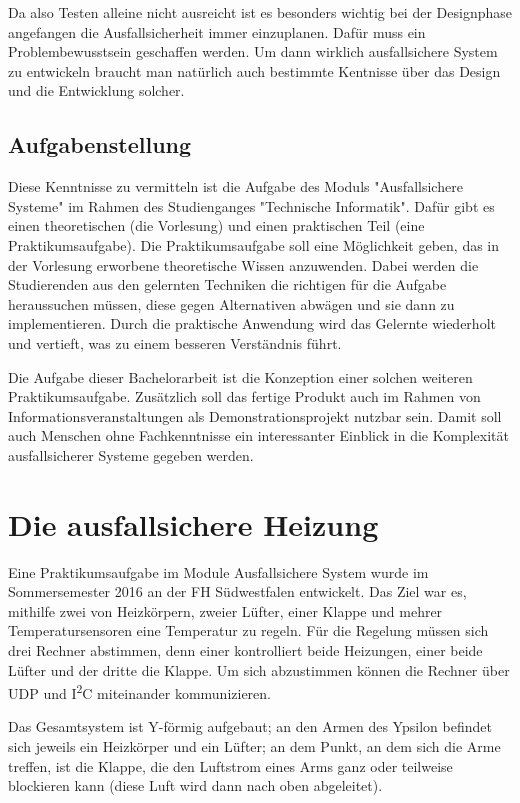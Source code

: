 Da also Testen alleine nicht ausreicht ist es besonders wichtig bei der Designphase angefangen die Ausfallsicherheit immer einzuplanen. Daf{\"{u}}r
muss ein Problembewusstsein geschaffen werden. Um dann wirklich ausfallsichere System zu entwickeln braucht man nat{\"{u}}rlich auch bestimmte Kentnisse 
{\"{u}}ber das Design und die Entwicklung solcher.

\subsection{Aufgabenstellung} 
Diese Kenntnisse zu vermitteln ist die Aufgabe des Moduls "Ausfallsichere Systeme" im Rahmen des Studienganges 
"Technische Informatik". Daf{\"{u}}r gibt es einen theoretischen (die Vorlesung) und einen praktischen Teil (eine 
Praktikumsaufgabe). Die Praktikumsaufgabe soll eine M{\"{o}}glichkeit geben, das in der Vorlesung erworbene 
theoretische Wissen anzuwenden. Dabei werden die Studierenden aus den gelernten Techniken die richtigen 
f{\"{u}}r die Aufgabe heraussuchen m{\"{u}}ssen, diese gegen Alternativen abw{\"{a}}gen und sie dann zu 
implementieren. Durch die  praktische Anwendung wird das Gelernte wiederholt und vertieft, was zu einem besseren 
Verst{\"{a}}ndnis f{\"{u}}hrt. 

Die Aufgabe dieser Bachelorarbeit ist die Konzeption einer solchen weiteren Praktikumsaufgabe. 
Zus{\"{a}}tzlich soll das fertige Produkt auch im Rahmen von Informationsveranstaltungen als Demonstrationsprojekt 
nutzbar sein. Damit soll auch Menschen ohne Fachkenntnisse ein interessanter Einblick in die 
Komplexit{\"{a}}t ausfallsicherer Systeme gegeben werden.

\section{Die ausfallsichere Heizung}\label{heizung}
Eine Praktikumsaufgabe im Module Ausfallsichere System wurde im Sommersemester 2016 an der FH S{\"{u}}dwestfalen entwickelt. Das Ziel war es, mithilfe zwei von Heizk{\"{o}}rpern, zweier
L{\"{u}}fter, einer Klappe und mehrer Temperatursensoren eine Temperatur zu regeln. F{\"{u}}r die Regelung m{\"{u}}ssen sich drei Rechner abstimmen, denn einer kontrolliert
beide Heizungen, einer beide L{\"{u}}fter und der dritte die Klappe. Um sich abzustimmen k{\"{o}}nnen die Rechner {\"{u}}ber UDP und I\textsuperscript{2}C miteinander kommunizieren.

Das Gesamtsystem ist Y-f{\"{o}}rmig aufgebaut; an den Armen des Ypsilon befindet sich jeweils ein Heizk{\"{o}}rper und ein L{\"{u}}fter; an dem Punkt, an dem sich
die Arme treffen, ist die Klappe, die den Luftstrom eines Arms ganz oder teilweise blockieren kann (diese Luft wird dann nach oben abgeleitet).

